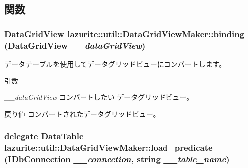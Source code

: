 \subsection{関数}
\hypertarget{classlazurite_1_1util_1_1_data_grid_view_maker_aa07340c1021a0749c64ffa0cca0bcd7d}{
\subsubsection[{binding}]{\setlength{\rightskip}{0pt plus 5cm}DataGridView lazurite::util::DataGridViewMaker::binding (DataGridView {\em \_\-\_\-dataGridView})}}
\label{classlazurite_1_1util_1_1_data_grid_view_maker_aa07340c1021a0749c64ffa0cca0bcd7d}


データテーブルを使用してデータグリッドビューにコンバートします。 
\begin{DoxyParams}{引数}
\item[{\em \_\-\_\-dataGridView}]コンバートしたい データグリッドビュー。\end{DoxyParams}
\begin{DoxyReturn}{戻り値}
コンバートされたデータグリッドビュー。
\end{DoxyReturn}
\hypertarget{classlazurite_1_1util_1_1_data_grid_view_maker_a7358a34bd5b5492d26254d29284cee7c}{
\subsubsection[{load\_\-predicate}]{\setlength{\rightskip}{0pt plus 5cm}delegate DataTable lazurite::util::DataGridViewMaker::load\_\-predicate (IDbConnection {\em \_\-\_\-connection}, \/  string {\em \_\-\_\-table\_\-name})}}
\label{classlazurite_1_1util_1_1_data_grid_view_maker_a7358a34bd5b5492d26254d29284cee7c}

